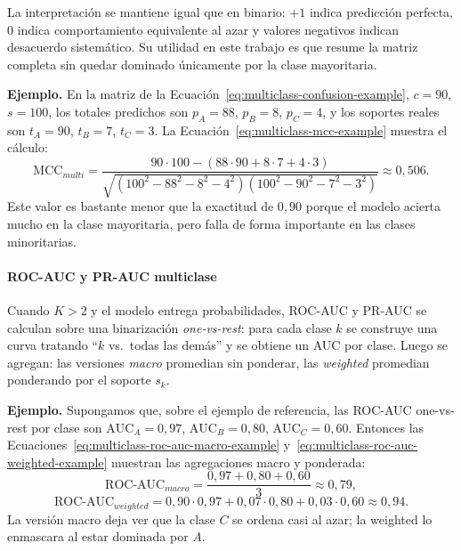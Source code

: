 \documentclass[12pt,oneside]{report}
\begin{document}
La interpretación se mantiene igual que en binario: $+1$ indica predicción perfecta, $0$ indica comportamiento equivalente al azar y valores negativos indican desacuerdo sistemático. Su utilidad en este trabajo es que resume la matriz completa sin quedar dominado únicamente por la clase mayoritaria.

\textbf{Ejemplo.} En la matriz de la Ecuación~\eqref{eq:multiclass-confusion-example}, $c=90$, $s=100$, los totales predichos son $p_A=88$, $p_B=8$, $p_C=4$, y los soportes reales son $t_A=90$, $t_B=7$, $t_C=3$. La Ecuación~\eqref{eq:multiclass-mcc-example} muestra el cálculo:
\begin{equation}
\label{eq:multiclass-mcc-example}
\mathrm{MCC}_{multi}=\frac{90\cdot100-(88\cdot90+8\cdot7+4\cdot3)}{\sqrt{(100^2-88^2-8^2-4^2)(100^2-90^2-7^2-3^2)}}\approx 0{,}506.
\end{equation}
Este valor es bastante menor que la exactitud de $0{,}90$ porque el modelo acierta mucho en la clase mayoritaria, pero falla de forma importante en las clases minoritarias.

\paragraph{ROC-AUC y PR-AUC multiclase}

Cuando $K>2$ y el modelo entrega probabilidades, ROC-AUC y PR-AUC se
calculan sobre una binarización \emph{one-vs-rest}: para cada clase $k$
se construye una curva tratando ``$k$ vs.\ todas las demás'' y se
obtiene un AUC por clase. Luego se agregan: las versiones \emph{macro}
promedian sin ponderar, las \emph{weighted} promedian ponderando por el
soporte $s_k$.

\textbf{Ejemplo.} Supongamos que, sobre el ejemplo de referencia, las
ROC-AUC one-vs-rest por clase son $\mathrm{AUC}_A=0{,}97$,
$\mathrm{AUC}_B=0{,}80$, $\mathrm{AUC}_C=0{,}60$. Entonces las Ecuaciones~\eqref{eq:multiclass-roc-auc-macro-example} y~\eqref{eq:multiclass-roc-auc-weighted-example} muestran las agregaciones macro y ponderada:
\begin{equation}
\label{eq:multiclass-roc-auc-macro-example}
\mathrm{ROC\text{-}AUC}_{macro}=\frac{0{,}97+0{,}80+0{,}60}{3}\approx 0{,}79,
\end{equation}
\begin{equation}
\label{eq:multiclass-roc-auc-weighted-example}
\mathrm{ROC\text{-}AUC}_{weighted}=0{,}90\cdot 0{,}97+0{,}07\cdot 0{,}80+0{,}03\cdot 0{,}60\approx 0{,}94.
\end{equation}
La versión macro deja ver que la clase $C$ se ordena casi al azar; la
weighted lo enmascara al estar dominada por $A$.
\end{document}
